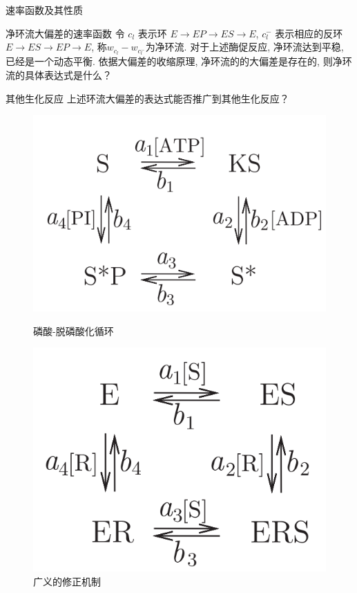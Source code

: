 \documentclass{beamer}
\begin{document}
	\begin{frame}{速率函数及其性质}
		\begin{block}{净环流大偏差的速率函数}
			令 $c_l$ 表示环 $E \longrightarrow EP \longrightarrow ES \longrightarrow E$, $c_l^-$ 表示相应的反环 $E \longrightarrow ES \longrightarrow EP \longrightarrow E$, 称$\mathit{w}_{c_l} - \mathit{w}_{c_l^-}$为净环流. 
			对于上述酶促反应, 净环流达到平稳, 已经是一个动态平衡. 依据大偏差的收缩原理, 净环流的的大偏差是存在的, 则净环流的具体表达式是什么？
		\end{block}
	\end{frame}

	\begin{frame}{其他生化反应}
		上述环流大偏差的表达式能否推广到其他生化反应？
		\begin{figure}[h]
			\begin{minipage}[t]{0.4\linewidth}
				\centering
				\includegraphics[scale=0.4]{phosphorylation_dephosphorylation_cycle.png}
				\caption{磷酸-脱磷酸化循环}
			\end{minipage}
			\begin{minipage}[t]{0.4\linewidth}
				\centering
				\includegraphics[scale=0.4]{general_modifier_machanism.png}
				\caption{广义的修正机制}
			\end{minipage}
	    \end{figure}
		

\end{frame}
\end{document}

